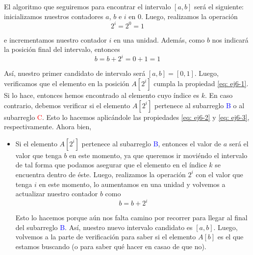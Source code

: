\documentclass[letterpaper,11pt]{article}
\begin{document}
\begin{enumerate}
\begin{enumerate}
        El algoritmo que seguiremos para encontrar el intervalo $[a, b]$ será 
        el siguiente: inicializamos nuestros contadores $a$, $b$ e $i$ en $0$. 
        Luego, realizamos la operación
        \begin{equation*}
            2^i = 2^0 = 1
        \end{equation*}
        
        e incrementamos nuestro contador $i$ en una unidad. Además, como $b$ 
        nos indicará la posición final del intervalo, entonces 
        \begin{equation*}
            b = b + 2^i = 0 + 1 = 1
        \end{equation*}
        
        Así, nuestro primer candidato de intervalo será $[a, b] = [0, 1]$.
        Luego, verificamos que el elemento en la posición $A[2^i]$ cumpla la 
        propiedad \ref{eq: ej6-1}. Si lo hace, entonces hemos encontrado al 
        elemento cuyo índice es $k$. En caso contrario, debemos verificar si el 
        elemento $A[2^i]$ pertenece al subarreglo \textcolor{blue}{B} o al 
        subarreglo \textcolor{red}{C}. Esto lo hacemos aplicándole las 
        propiedades \ref{eq: ej6-2} y \ref{eq: ej6-3}, respectivamente. Ahora 
        bien, 
        \begin{itemize}
            \item Si el elemento $A[2^i]$ pertenece al subarreglo 
            \textcolor{blue}{B}, entonces el valor de $a$ será el valor que 
            tenga $b$ en este momento, ya que  queremos ir moviéndo el intervalo 
            de tal forma que podamos asegurar que el elemento en el índice $k$ 
            se encuentra dentro de éste. Luego, realizamos la operación $2^i$ 
            con el valor que tenga $i$ en este momento, lo aumentamos en una 
            unidad y volvemos a actualizar nuestro contador $b$ como 
            \begin{equation*}
                b = b + 2^i
            \end{equation*}
    
            Esto lo hacemos porque aún nos falta camino por recorrer para llegar 
            al final del subarreglo \textcolor{blue}{B}. Así, nuestro nuevo 
            intervalo candidato es $[a, b]$. Luego, volvemos a la parte de 
            verificación para saber si el elemento $A[b]$ es el que estamos 
            buscando (o para saber qué hacer en casao de que no).


\end{itemize}
\end{enumerate}
\end{enumerate}
\end{document}
